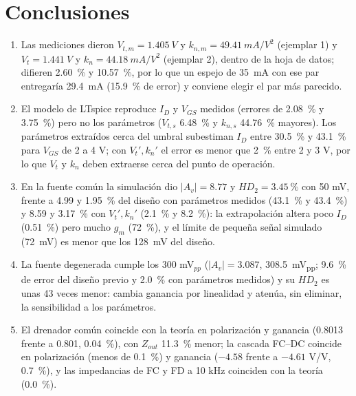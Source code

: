 \documentclass[conference]{IEEEtran}
\newcommand{\gm}{g_m}
\newcommand{\kn}{k_n}
\newcommand{\Vtp}{V_t'}
\newcommand{\knp}{k_n'}
\newcommand{\Vts}{V_{t,s}}
\newcommand{\kns}{k_{n,s}}
\newcommand{\Vtm}{V_{t,m}}
\newcommand{\knm}{k_{n,m}}
\begin{document}
\section{Conclusiones}
\begin{enumerate}
\item Las mediciones dieron $\Vtm=\SI{1.405}{V}$ y $\knm=\SI{49.41}{mA/V^2}$ (ejemplar 1) y $V_t=\SI{1.441}{V}$ y $\kn=\SI{44.18}{mA/V^2}$ (ejemplar 2), dentro de la hoja de datos; difieren \SI{2.60}{\percent} y \SI{10.57}{\percent}, por lo que un espejo de \SI{35}{mA} con ese par entregaría \SI{29.4}{mA} (\SI{15.9}{\percent} de error) y conviene elegir el par más parecido.
\item El modelo de LTspice reproduce $I_D$ y $V_{GS}$ medidos (errores de \SI{2.08}{\percent} y \SI{3.75}{\percent}) pero no los parámetros ($\Vts$ \SI{6.48}{\percent} y $\kns$ \SI{44.76}{\percent} mayores). Los parámetros extraídos cerca del umbral subestiman $I_D$ entre \SI{30.5}{\percent} y \SI{43.1}{\percent} para $V_{GS}$ de 2 a 4 V; con $\Vtp,\knp$ el error es menor que \SI{2}{\percent} entre 2 y 3 V, por lo que $V_t$ y $\kn$ deben extraerse cerca del punto de operación.
\item En la fuente común la simulación dio $|A_v|=8.77$ y $HD_2=\SI{3.45}{\percent}$ con 50 mV, frente a 4.99 y \SI{1.95}{\percent} del diseño con parámetros medidos (\SI{43.1}{\percent} y \SI{43.4}{\percent}) y 8.59 y \SI{3.17}{\percent} con $\Vtp,\knp$ (\SI{2.1}{\percent} y \SI{8.2}{\percent}): la extrapolación altera poco $I_D$ (\SI{0.51}{\percent}) pero mucho $\gm$ (\SI{72}{\percent}), y el límite de pequeña señal simulado (\SI{72}{mV}) es menor que los \SI{128}{mV} del diseño.
\item La fuente degenerada cumple los 300 mV$_{pp}$ ($|A_v|=3.087$, \SI{308.5}{mV_{pp}}; \SI{9.6}{\percent} de error del diseño previo y \SI{2.0}{\percent} con parámetros medidos) y su $HD_2$ es unas 43 veces menor: cambia ganancia por linealidad y atenúa, sin eliminar, la sensibilidad a los parámetros.
\item El drenador común coincide con la teoría en polarización y ganancia (0.8013 frente a 0.801, \SI{0.04}{\percent}), con $Z_{out}$ \SI{11.3}{\percent} menor; la cascada FC--DC coincide en polarización (menos de \SI{0.1}{\percent}) y ganancia ($-4.58$ frente a $-4.61$ V/V, \SI{0.7}{\percent}), y las impedancias de FC y FD a 10 kHz coinciden con la teoría (\SI{0.0}{\percent}).

\end{enumerate}
\end{document}
